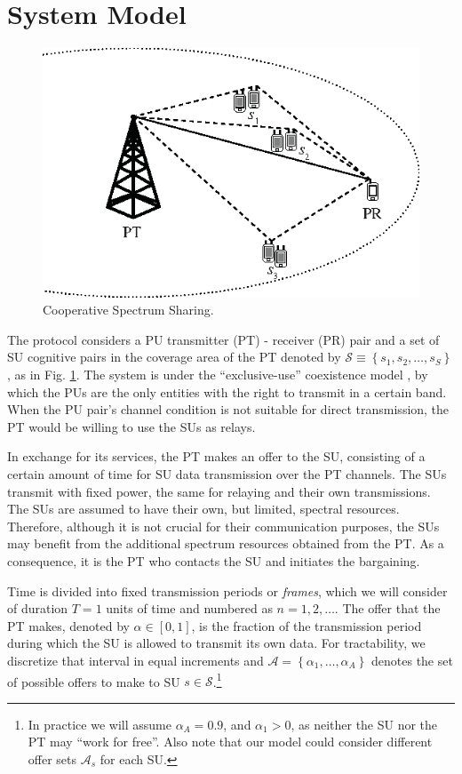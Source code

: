 \section{System Model}\label{sec:Sys}

\begin{figure}[!t]
\centering
\includegraphics{geo.eps}
\caption{Cooperative Spectrum Sharing.}
\label{fig:geo}
\end{figure}

The protocol considers a PU transmitter (PT) - receiver (PR) pair and a set of SU cognitive pairs in the coverage area of the PT denoted by $\mathcal{S}\equiv\left\{s_1,s_2,\ldots,s_S\right\}$, as in Fig. \ref{fig:geo}.
The system is under the ``exclusive-use'' coexistence model \cite{ref:Zhao2007_sur}, by which the PUs are the only entities with the right to transmit in a certain band. 
When the PU pair's channel condition is not suitable for direct transmission, the PT would be willing to use the SUs as relays.

In exchange for its services, the PT makes an offer to the SU, consisting of a certain amount of time for SU data transmission over the PT channels. 
The SUs transmit with fixed power, the same for relaying and their own transmissions. 
The SUs are assumed to have their own, but limited, spectral resources. Therefore, although it is not crucial for their communication purposes, the SUs may benefit from the additional spectrum resources obtained from the PT.
As a consequence, it is the PT who contacts the SU and initiates the bargaining.

Time is divided into fixed transmission periods or \textit{frames}, which we will consider of duration $T = 1$ units of time and numbered as $n=1,2,\ldots$. 
The offer that the PT makes, denoted by $\alpha \in [0,1]$, is the fraction of the transmission period during which the SU is allowed to transmit its own data.
For tractability, we discretize that interval in equal increments and $\mathcal{A} = \left\{\alpha_{1},\ldots,\alpha_{A}\right\}$ denotes the set of possible offers to make to SU $s \in \mathcal{S}$.\footnote{In practice we will assume $\alpha_{A} = 0.9$, and $\alpha_1>0$, as neither the SU nor the PT may ``work for free''. Also note that our model could consider different offer sets $\mathcal{A}_s$ for each SU.} 

